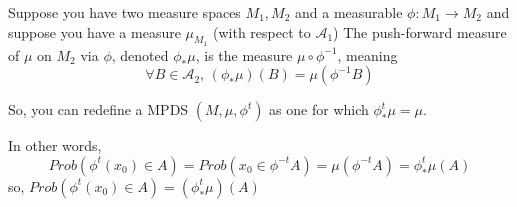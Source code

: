 \begin{definition}[/terminology]
    Suppose you have two measure spaces $M_1, M_2$ and a measurable $\phi:M_1\rightarrow M_2$ and suppose you have a measure $\mu_{M_1}$ (with respect to $\mathcal{A}_1$) The push-forward measure of $\mu$ on $M_2$ via $\phi$, denoted $\phi_*\mu$, is the measure $\mu\circ\phi^{-1}$, meaning \begin{equation*}
    \forall B\in \mathcal{A}_2,\, (\phi_*\mu)(B)=\mu(\phi^{-1}B)
    \end{equation*}
\end{definition}

\begin{observation}
    So, you can redefine a MPDS $(M, \mu, \phi^t)$ as one for which $\phi^t_*\mu=\mu$.

    In other words, \begin{equation*}
    Prob(\phi^t(x_0)\in A)=Prob(x_0\in\phi^{-t}A)=\mu(\phi^{-t}A)=\phi^t_*\mu(A)
    \end{equation*}
    so, $Prob(\phi^t(x_0)\in A)=(\phi^t_*\mu)(A)$
\end{observation}